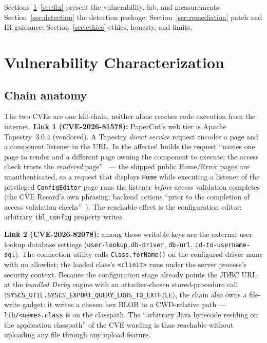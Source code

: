 \documentclass[journal]{IEEEtran}
\begin{document}
Sections~\ref{sec:char}–\ref{sec:fix} present the vulnerability, lab, and
measurements; Section~\ref{sec:detection} the detection package; Section~\ref{sec:remediation}
patch and IR guidance; Section~\ref{sec:ethics} ethics, honesty, and limits.

\section{Vulnerability Characterization}
\label{sec:char}

\subsection{Chain anatomy}
The two CVEs are one kill-chain; neither alone reaches code execution from the
internet. \textbf{Link 1 (CVE-2026-81578):} PaperCut's web tier is Apache
Tapestry~3.0.4 (vendored). A Tapestry \emph{direct service} request encodes a
page and a component listener in the URL. In the affected builds the request
``names one page to render and a different page owning the component to
execute; the access check trusts the \emph{rendered} page''~\cite{r7,facts} —
the shipped public Home/Error pages are unauthenticated, so a request that
displays \texttt{Home} while executing a listener of the privileged
\texttt{ConfigEditor} page runs the listener \emph{before} access validation
completes (the CVE Record's own phrasing: backend actions ``prior to the
completion of access validation checks''~\cite{cve81578}). The reachable effect
is the configuration editor: arbitrary \texttt{tbl\_config} property writes.

\textbf{Link 2 (CVE-2026-82078):} among those writable keys are the external
user-lookup database settings (\texttt{user-lookup.db-driver},
\texttt{db-url}, \texttt{id-to-username-sql}). The connection utility calls
\texttt{Class.forName()} on the configured driver name with no allowlist; the
loaded class's \texttt{<clinit>} runs under the server process's security
context. Because the configuration stage already points the JDBC URL at the
\emph{bundled Derby} engine with an attacker-chosen stored-procedure call
(\texttt{SYSCS\_UTIL.\hspace{0pt}SYSCS\_EXPORT\_QUERY\_\hspace{0pt}LOBS\_TO\_EXTFILE}), the chain also
owns a file-write gadget: it writes a chosen hex BLOB to a CWD-relative path —
\texttt{lib/<name>.class} is on the classpath. The ``arbitrary Java bytecode
residing on the application classpath'' of the CVE wording is thus reachable
without uploading any file through any upload feature.
\end{document}
